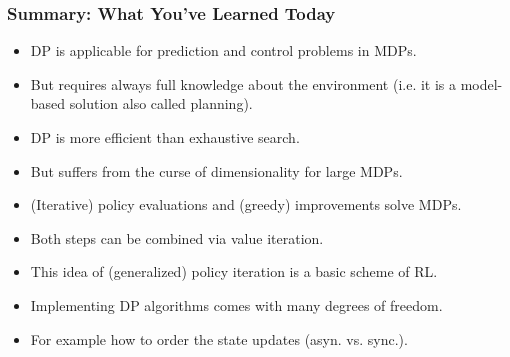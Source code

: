 \begin{frame}
\frametitle{Summary: What You've Learned Today}
\begin{itemize}
	\item DP is applicable for prediction and control problems in MDPs.\pause
	\item But requires always full knowledge about the environment (i.e. it is a model-based solution also called planning).\pause
	\item DP is more efficient than exhaustive search.\pause
	\item But suffers from the curse of dimensionality for large MDPs.\pause
	\item (Iterative) policy evaluations and (greedy) improvements solve MDPs.\pause
	\item Both steps can be combined via value iteration.\pause
	\item This idea of (generalized) policy iteration is a basic scheme of RL.\pause
	\item Implementing DP algorithms comes with many degrees of freedom.
	\item For example how to order the state updates (asyn. vs. sync.).
\end{itemize}
\end{frame}

